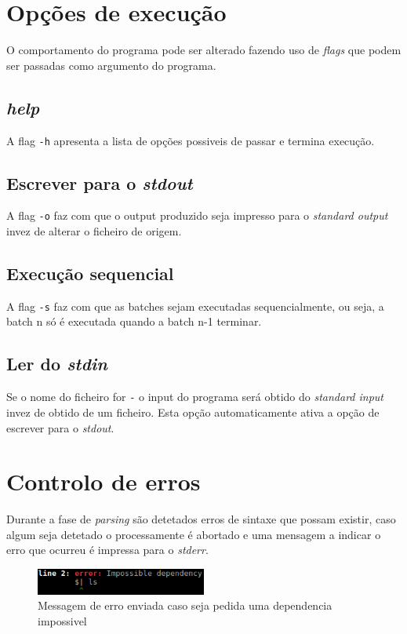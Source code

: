 \documentclass[12pt,a4paper]{report}
\begin{document}
\chapter{Opções de execução}
    O comportamento do programa pode ser alterado fazendo uso de \textit{flags}
    que podem ser passadas como argumento do programa.
    \section{\textit{help}}
        A flag \texttt{-h} apresenta a lista de opções possiveis
        de passar e termina execução.
    \section{Escrever para o \textit{stdout}}
        A flag \texttt{-o} faz com que o output produzido seja
        impresso para o \textit{standard output} invez de alterar o ficheiro
        de origem.
    \section{Execução sequencial}
        A flag \texttt{-s} faz com que as batches sejam executadas
        sequencialmente, ou seja, a batch n só é executada quando a batch n-1
        terminar.
    \section{Ler do \textit{stdin}}
        Se o nome do ficheiro for \texttt{-} o input do programa será
        obtido do \textit{standard input} invez de obtido de um ficheiro. Esta
        opção automaticamente ativa a opção de escrever para o \textit{stdout}.

\chapter{Controlo de erros}
    Durante a fase de \textit{parsing} são detetados erros de sintaxe que possam
    existir, caso algum seja detetado o processamente é abortado e uma mensagem
    a indicar o erro que ocurreu é impressa para o \textit{stderr}.

    \begin{figure}[h]
        \centering
        \includegraphics[width=0.5\textwidth]{./images/parseError.png}
        \caption{Messagem de erro enviada caso seja pedida uma dependencia
                    impossivel}
        \label{fig:parseError}
    \end{figure}
\end{document}

